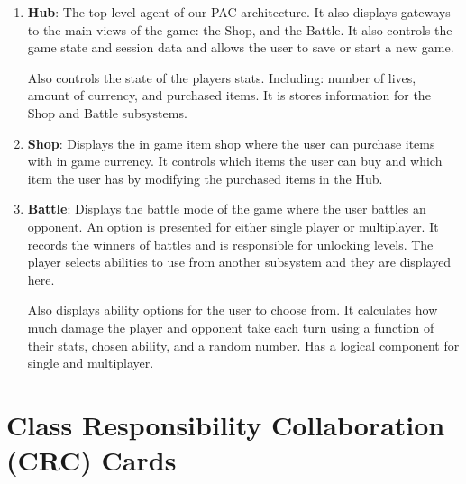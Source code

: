 \documentclass[]{article}
\begin{document}
\begin{enumerate}[i]

    \item \textbf{Hub}: The top level agent of our PAC architecture. It also displays gateways to the main views of the game: the Shop, and the Battle. It also controls the game state and session data and allows the user to save or start a new game.
    
    Also controls the state of the players stats. Including: number of lives, amount of currency, and purchased items. It is stores information for the Shop and Battle subsystems.
    
    \item \textbf{Shop}: Displays the in game item shop where the user can purchase items with in game currency. It controls which items the user can buy and which item the user has by modifying the purchased items in the Hub.
    
    \item \textbf{Battle}: Displays the battle mode of the game where the user battles an opponent. An option is presented for either single player or multiplayer. It records the winners of battles and is responsible for unlocking levels. The player selects abilities to use from another subsystem and they are displayed here. 
    
    Also displays ability options for the user to choose from. It calculates how much damage the player and opponent take each turn using a function of their stats, chosen ability, and a random number. Has a logical component for single and multiplayer.

\end{enumerate}




	
\section{Class Responsibility Collaboration (CRC) Cards}
\label{sec:class_responsibility_collaboration_crc_cards}
\end{document}
